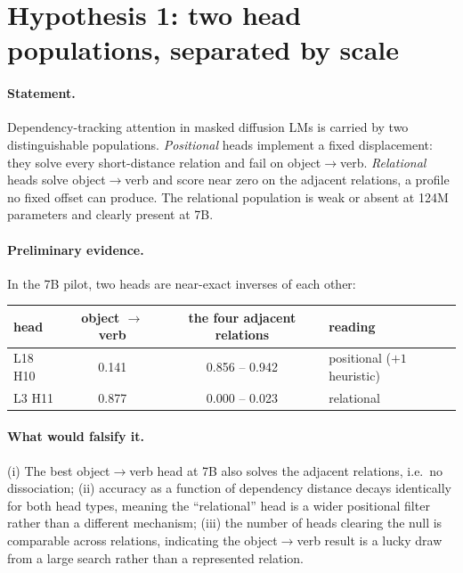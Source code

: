 \documentclass{article}
\begin{document}
\section{Hypothesis 1: two head populations, separated by scale}

\paragraph{Statement.} Dependency-tracking attention in masked diffusion LMs is
carried by two distinguishable populations. \emph{Positional} heads implement a
fixed displacement: they solve every short-distance relation and fail on
object$\to$verb. \emph{Relational} heads solve object$\to$verb and score near
zero on the adjacent relations, a profile no fixed offset can produce. The
relational population is weak or absent at 124M parameters and clearly present
at 7B.

\paragraph{Preliminary evidence.} In the 7B pilot, two heads are near-exact
inverses of each other:

\begin{center}\small
\begin{tabular}{lccl}
\toprule
head & object $\to$ verb & the four adjacent relations & reading \\
\midrule
L18 H10 & 0.141 & 0.856 -- 0.942 & positional ($+1$ heuristic) \\
L3 H11  & 0.877 & 0.000 -- 0.023 & relational \\
\bottomrule
\end{tabular}
\end{center}

\paragraph{What would falsify it.} (i) The best object$\to$verb head at 7B also
solves the adjacent relations, i.e.\ no dissociation; (ii) accuracy as a
function of dependency distance decays identically for both head types, meaning
the ``relational'' head is a wider positional filter rather than a different
mechanism; (iii) the number of heads clearing the null is comparable across
relations, indicating the object$\to$verb result is a lucky draw from a large
search rather than a represented relation.
\end{document}
